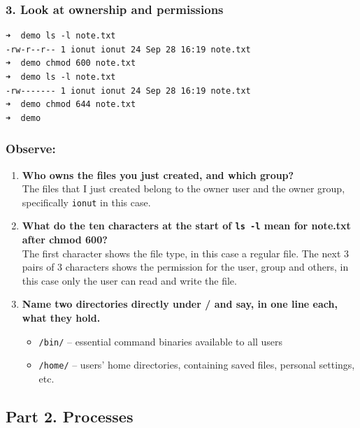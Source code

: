 \documentclass{labreport}
\begin{document}
\subsubsection{3. Look at ownership and permissions}
\begin{lstlisting}[style=bash]
➜  demo ls -l note.txt
-rw-r--r-- 1 ionut ionut 24 Sep 28 16:19 note.txt
➜  demo chmod 600 note.txt
➜  demo ls -l note.txt
-rw------- 1 ionut ionut 24 Sep 28 16:19 note.txt
➜  demo chmod 644 note.txt
➜  demo
\end{lstlisting}

\subsubsection*{Observe:}
\begin{enumerate}[leftmargin=*]
    \item \textbf{Who owns the files you just created, and which group?}\\[0.2em]
    The files that I just created belong to the owner user and the owner group, specifically \texttt{ionut} in this case.

    \item \textbf{What do the ten characters at the start of \texttt{ls -l} mean for note.txt after chmod 600?}\\[0.2em]
    The first character shows the file type, in this case a regular file. The next 3 pairs of 3 characters shows the permission for the user, group and others, in this case only the user can read and write the file.

    \item \textbf{Name two directories directly under / and say, in one line each, what they hold.}
    \begin{itemize}[noitemsep, topsep=2pt]
        \item \texttt{/bin/} -- essential command binaries available to all users
        \item \texttt{/home/} -- users' home directories, containing saved files, personal settings, etc.
    \end{itemize}
\end{enumerate}

\subsection{Part 2. Processes}
\end{document}
